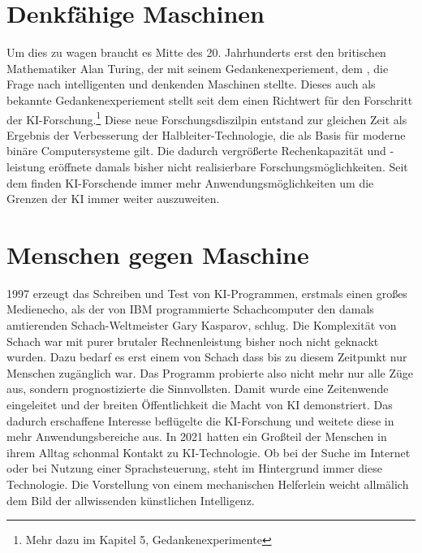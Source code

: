 \documentclass[12pt,german,ngerman]{report}
\begin{document}
    \section{Denkfähige Maschinen}
        Um dies zu wagen braucht es Mitte des 20. Jahrhunderts erst den britischen Mathematiker Alan Turing, 
        der mit seinem Gedankenexperiement, dem , 
        die Frage nach intelligenten und denkenden Maschinen stellte.
        Dieses auch als  bekannte Gedankenexperiement stellt seit dem einen 
        Richtwert für den Forschritt der KI-Forschung.\footnote{Mehr dazu im Kapitel 5, Gedankenexperimente}
        Diese neue Forschungsdiszilpin entstand zur gleichen Zeit als Ergebnis 
        der Verbesserung der Halbleiter-Technologie, die als Basis für 
        moderne binäre Computersysteme gilt. Die dadurch vergrößerte Rechenkapazität und -leistung 
        eröffnete damals bisher nicht realisierbare Forschungsmöglichkeiten. 
        Seit dem finden KI-Forschende immer mehr Anwendungsmöglichkeiten um die Grenzen der KI immer weiter auszuweiten.\\
    
    \section{Menschen gegen Maschine}
        1997 erzeugt das Schreiben und Test von KI-Programmen, erstmals einen großes Medienecho, 
        als der von IBM programmierte Schachcomputer
         den damals amtierenden Schach-Weltmeister Gary Kasparov, schlug.\cite{chessbase2017kasparovdeepblue} 
        Die Komplexität von Schach war mit purer brutaler
        Rechnenleistung bisher noch nicht geknackt wurden. Dazu bedarf es erst einem  von Schach dass bis zu diesem
        Zeitpunkt nur Menschen zugänglich war. Das Programm probierte also nicht mehr nur alle Züge aus, sondern prognostizierte die 
        Sinnvollsten. Damit wurde eine Zeitenwende eingeleitet und der breiten Öffentlichkeit die Macht von KI demonstriert.
        Das dadurch erschaffene Interesse beflügelte die KI-Forschung und weitete diese in mehr Anwendungsbereiche aus.
        In 2021 hatten ein Großteil der Menschen in ihrem Alltag schonmal Kontakt zu KI-Technologie. 
        Ob bei der Suche im Internet oder bei Nutzung einer Sprachsteuerung, steht im Hintergrund immer diese Technologie.
        Die Vorstellung von einem mechanischen Helferlein weicht allmälich dem Bild der allwissenden künstlichen Intelligenz.
\end{document}
